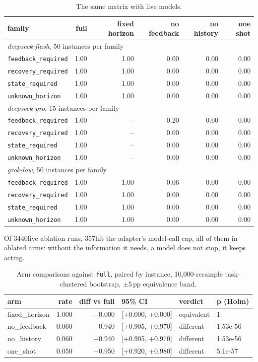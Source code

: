 \documentclass[11pt,a4paper]{article}
\begin{document}
\begin{table}[h]\centering\small
\caption{The same matrix with live models.}
\label{tab:witnesslive}
\begin{tabular}{lrrrrr}
\toprule
family & full & fixed horizon & no feedback & no history & one shot \\
\midrule
\multicolumn{6}{l}{\emph{deepseek-flash}, 50 instances per family} \\
\texttt{feedback\_required} & 1.00 & 1.00 & 0.00 & 0.00 & 0.00 \\
\texttt{recovery\_required} & 1.00 & 1.00 & 0.00 & 0.00 & 0.00 \\
\texttt{state\_required} & 1.00 & 1.00 & 0.00 & 0.00 & 0.00 \\
\texttt{unknown\_horizon} & 1.00 & 1.00 & 0.00 & 0.00 & 0.00 \\
\midrule
\multicolumn{6}{l}{\emph{deepseek-pro}, 15 instances per family} \\
\texttt{feedback\_required} & 1.00 & -- & 0.20 & 0.00 & 0.00 \\
\texttt{recovery\_required} & 1.00 & -- & 0.00 & 0.00 & 0.00 \\
\texttt{state\_required} & 1.00 & -- & 0.00 & 0.00 & 0.00 \\
\texttt{unknown\_horizon} & 1.00 & -- & 0.00 & 0.00 & 0.00 \\
\midrule
\multicolumn{6}{l}{\emph{grok-low}, 50 instances per family} \\
\texttt{feedback\_required} & 1.00 & 1.00 & 0.06 & 0.00 & 0.00 \\
\texttt{recovery\_required} & 1.00 & 1.00 & 0.00 & 0.00 & 0.00 \\
\texttt{state\_required} & 1.00 & 1.00 & 0.00 & 0.00 & 0.00 \\
\texttt{unknown\_horizon} & 1.00 & 1.00 & 0.00 & 0.00 & 0.00 \\
\bottomrule
\end{tabular}
\end{table}

Of 3440live ablation runs, 357hit the adapter's
model-call cap, all of them in ablated arms: without the information it needs,
a model does not stop, it keeps acting.

\begin{table}[h]\centering\small
\caption{Arm comparisons against \texttt{full}, paired by instance,
10{,}000-resample task-clustered bootstrap, $\pm5$\,pp equivalence band.}
\label{tab:armequiv}
\begin{tabular}{lrrlll}
\toprule
arm & rate & diff vs full & 95\% CI & verdict & p (Holm) \\
\midrule
fixed\_horizon & 1.000 & +0.000 & [+0.000, +0.000] & equivalent & 1 \\
no\_feedback & 0.060 & +0.940 & [+0.905, +0.970] & different & 1.53e-56 \\
no\_history & 0.060 & +0.940 & [+0.905, +0.970] & different & 1.53e-56 \\
one\_shot & 0.050 & +0.950 & [+0.920, +0.980] & different & 5.1e-57 \\
\bottomrule
\end{tabular}
\end{table}
\end{document}
